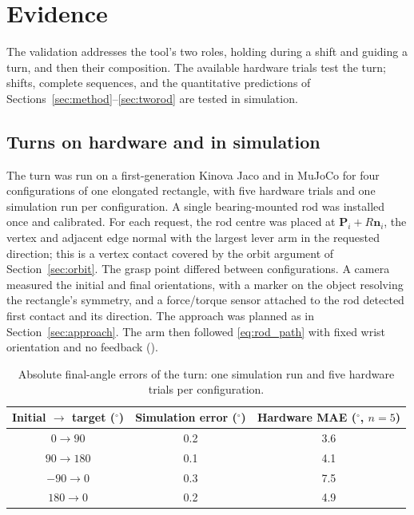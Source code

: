 \section{Evidence}
\label{sec:experiments}

The validation addresses the tool's two roles, holding during a shift and guiding a turn, and then their composition. The available hardware trials test the turn; shifts, complete sequences, and the quantitative predictions of Sections~\ref{sec:method}--\ref{sec:tworod} are tested in simulation.

\subsection{Turns on hardware and in simulation}
\label{sec:exp_turn}

The turn was run on a first-generation Kinova Jaco and in MuJoCo \cite{todorov2012mujoco} for four configurations of one elongated rectangle, with five hardware trials and one simulation run per configuration. A single bearing-mounted rod was installed once and calibrated. For each request, the rod centre was placed at $\mathbf P_i+R\mathbf n_i$, the vertex and adjacent edge normal with the largest lever arm in the requested direction; this is a vertex contact covered by the orbit argument of Section~\ref{sec:orbit}. The grasp point differed between configurations. A camera measured the initial and final orientations, with a marker on the object resolving the rectangle's symmetry, and a force/torque sensor attached to the rod detected first contact and its direction. The approach was planned as in Section~\ref{sec:approach}. The arm then followed \eqref{eq:rod_path} with fixed wrist orientation and no feedback ().



\begin{table}[htbp]
    \centering
    \renewcommand{\arraystretch}{1.1}
    \begin{tabular}{ccc}
        \hline
        Initial $\rightarrow$ target ($^{\circ}$) & Simulation error ($^{\circ}$) & Hardware MAE ($^{\circ}$, $n=5$) \\
        \hline
        $0\rightarrow90$ & 0.2 & 3.6 \\
        $90\rightarrow180$ & 0.1 & 4.1 \\
        $-90\rightarrow0$ & 0.3 & 7.5 \\
        $180\rightarrow0$ & 0.2 & 4.9 \\
        \hline
    \end{tabular}
    \caption{Absolute final-angle errors of the turn: one simulation run and five hardware trials per configuration.}
    \label{tab:results}
\end{table}

